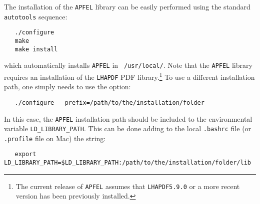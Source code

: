 \documentclass[11pt,a4paper]{article}
\begin{document}
The installation of the {\tt APFEL} library  can be easily  performed 
using the standard {\tt autotools} sequence:
\begin{lstlisting}
   ./configure
   make
   make install
\end{lstlisting}
which automatically installs {\tt APFEL} in  {\tt
  /usr/local/}. 
%
Note that the {\tt APFEL} library requires an installation of the {\tt LHAPDF} PDF library.\footnote{The
current release of {\tt APFEL} assumes that {\tt LHAPDF5.9.0} or
a more recent version has been previously installed.
}
%
To use a different installation path, one simply needs to
use the option:
\begin{lstlisting}
   ./configure --prefix=/path/to/the/installation/folder
\end{lstlisting}
%
In this case, the {\tt APFEL} installation path should be included
to the environmental variable {\tt LD\_LIBRARY\_PATH}.
%
This can be done adding to the local {\tt .bashrc} file (or {\tt
  .profile} file on Mac) the string:
\begin{lstlisting}
   export LD_LIBRARY_PATH=$LD_LIBRARY_PATH:/path/to/the/installation/folder/lib
\end{lstlisting}
\end{document}
